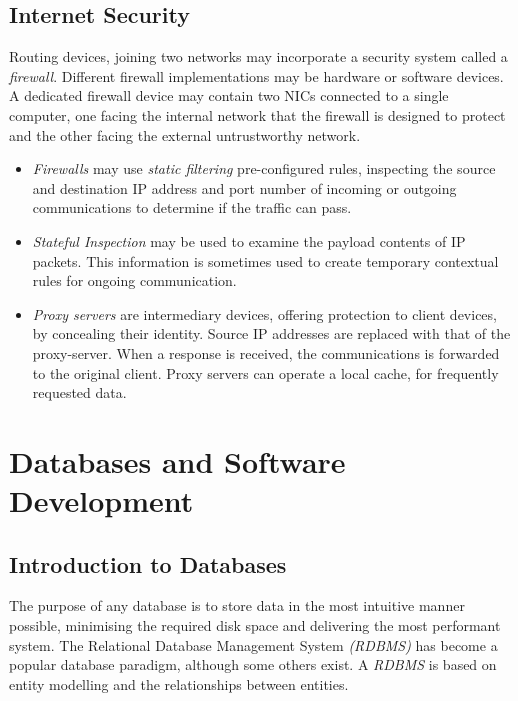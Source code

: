 \documentclass[10pt]{article}
\let\oldsection\section
\renewcommand\section{\clearpage\oldsection}
\begin{document}
\subsection{Internet Security}
\label{sec:orgb1266fb}

Routing devices, joining two networks may incorporate a security system called a \emph{firewall}. Different firewall implementations may be hardware or software devices. A dedicated firewall device may contain two NICs connected to a single computer, one facing the internal network that the firewall is designed to protect and the other facing the external untrustworthy network.

\begin{itemize}
\item \emph{Firewalls} may use \emph{static filtering} pre-configured rules, inspecting the source and destination IP address and port number of incoming or outgoing communications to determine if the traffic can pass.

\item \emph{Stateful Inspection} may be used to examine the payload contents of IP packets. This information is sometimes used to create temporary contextual rules for ongoing communication.

\item \emph{Proxy servers} are intermediary devices, offering protection to client devices, by concealing their identity. Source IP addresses are replaced with that of the proxy-server. When a response is received, the communications is forwarded to the original client. Proxy servers can operate a local cache, for frequently requested data.
\end{itemize}

\section{Databases and Software Development}
\label{sec:org6ea0978}
\subsection{Introduction to Databases}
\label{sec:org2e6ad9f}

The purpose of any database is to store data in the most intuitive manner possible, minimising the required disk space and delivering the most performant system. The Relational Database Management System \emph{(RDBMS)} has become a popular database paradigm, although some others exist. A \emph{RDBMS} is based on entity modelling and the relationships between entities.
\end{document}
